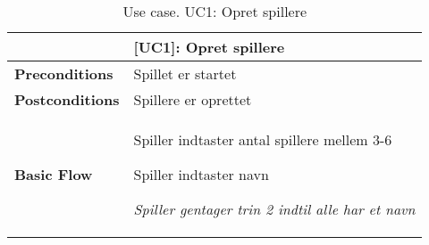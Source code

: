 \documentclass[class=article, crop=false]{standalone}
\makeatletter
\let\savespace\@minipagetrue
\makeatother
\begin{document}
    \begin{table}[H]
        \caption{Use case. UC1: Opret spillere}
        \begin{tabularx}{\textwidth}{|l|X|}
            \hline
            & \textbf{[UC1]: Opret spillere}   \\ \hline
            \textbf{Preconditions}       & Spillet er startet \\ \hline
            \textbf{Postconditions}      & Spillere er oprettet\\ \hline


            \textbf{Basic Flow} & \begin{tabenum}
                                      \item Spiller indtaster antal spillere mellem 3-6
                                      \item Spiller indtaster navn
                                      \savespace
                                      \begin{compactitem}
                                          \item \textit{Spiller gentager trin 2                                                             indtil alle har et navn}
                                      \end{compactitem}

            \end{tabenum}   \\ \hline

        \end{tabularx}


    \end{table}
\end{document}
